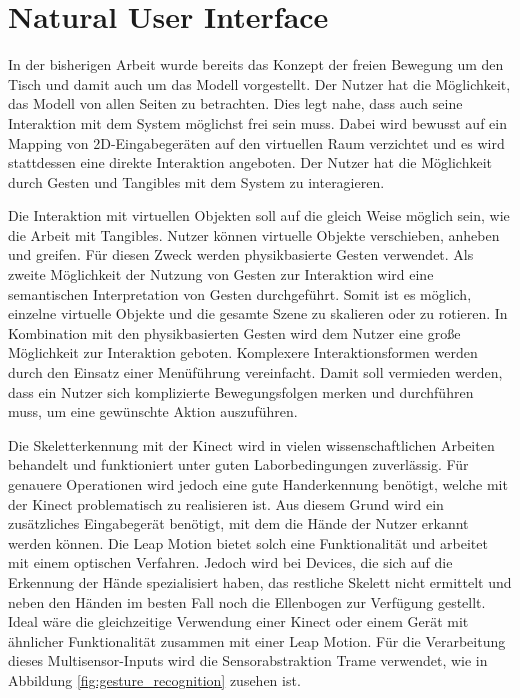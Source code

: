 \section{Natural User Interface}
\label{sec:nui}


In der bisherigen Arbeit wurde bereits das Konzept der freien Bewegung um den Tisch und damit auch um das Modell
vorgestellt. Der Nutzer hat die Möglichkeit, das Modell von allen Seiten zu betrachten. Dies legt nahe, dass auch seine
Interaktion mit dem System möglichst frei sein muss.
Dabei wird bewusst auf ein Mapping von 2D-Eingabegeräten auf den virtuellen Raum verzichtet und es wird stattdessen eine
direkte Interaktion angeboten. Der Nutzer hat die Möglichkeit durch Gesten und Tangibles mit dem System zu interagieren.

Die Interaktion mit virtuellen Objekten soll auf die gleich Weise möglich sein, wie die Arbeit mit Tangibles. Nutzer
können virtuelle Objekte verschieben, anheben und greifen. Für diesen Zweck werden physikbasierte Gesten verwendet.
Als zweite Möglichkeit der Nutzung von Gesten zur Interaktion wird eine semantischen Interpretation von Gesten
durchgeführt. Somit ist es möglich, einzelne virtuelle Objekte und die gesamte Szene zu skalieren oder zu rotieren.
In Kombination mit den physikbasierten Gesten wird dem Nutzer eine große Möglichkeit zur Interaktion geboten.
Komplexere Interaktionsformen werden durch den Einsatz einer Menüführung vereinfacht. Damit soll vermieden werden, dass
ein Nutzer sich komplizierte Bewegungsfolgen merken und durchführen muss, um eine gewünschte Aktion auszuführen.


Die Skeletterkennung mit der Kinect wird in vielen wissenschaftlichen Arbeiten behandelt und funktioniert unter guten
Laborbedingungen zuverlässig. Für genauere Operationen wird jedoch eine gute Handerkennung benötigt, welche mit der
Kinect problematisch zu realisieren ist. Aus diesem Grund wird ein zusätzliches Eingabegerät benötigt, mit dem die
Hände der Nutzer erkannt werden können. Die Leap Motion bietet solch eine Funktionalität und arbeitet mit einem
optischen Verfahren. Jedoch wird bei Devices, die sich auf die Erkennung der Hände spezialisiert haben, das restliche
Skelett nicht ermittelt und neben den Händen im besten Fall noch die Ellenbogen zur Verfügung gestellt.
Ideal wäre die gleichzeitige Verwendung einer Kinect oder einem Gerät mit ähnlicher Funktionalität zusammen mit einer
Leap Motion. Für die Verarbeitung dieses Multisensor-Inputs wird die Sensorabstraktion Trame verwendet, wie in Abbildung
\ref{fig:gesture_recognition} zusehen ist.


